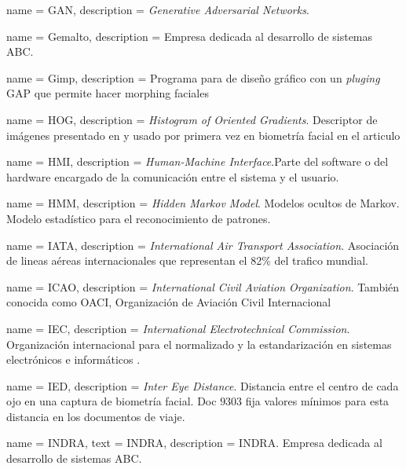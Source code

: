 {
    name        = {GAN},
    description = {\textit{Generative Adversarial Networks}.}
}

{
    name        = {Gemalto},
    description = {Empresa dedicada al desarrollo de sistemas ABC.}
}

{
    name        = {Gimp},
    description = {Programa para de diseño gráfico con un \textit{pluging} GAP que permite hacer \gls{morphing} faciales}
}

{
    name        = {HOG},
    description = {\textit{Histogram of Oriented Gradients}. Descriptor de imágenes presentado en \cite{mcconnell1986method} y usado por primera vez en biometría facial en el articulo \cite{shu2011histogram}}
}

{
    name        = {HMI},
    description = {\textit{Human-Machine Interface}.Parte del software o del hardware encargado de la comunicación entre el sistema y el usuario.}
}

{
    name        = {HMM},
    description = {\textit{Hidden Markov Model}. Modelos ocultos de Markov. Modelo estadístico para el reconocimiento de patrones.}
}

{
    name        = {IATA},
    description = {\textit{International Air Transport Association}. Asociación de lineas aéreas internacionales que representan el 82\% del trafico mundial.}
}

{
    name        = {ICAO},
    description = {\textit{International Civil Aviation Organization}. También conocida como OACI, Organización de Aviación Civil Internacional \cite{ICAOOnline}}
}

{
    name        = {IEC},
    description = {\textit{International Electrotechnical Commission}. Organización internacional para el normalizado y la estandarización en sistemas electrónicos e informáticos \cite{IECOnline}.}
}

{
    name        = {IED},
    description = {\textit{Inter Eye Distance}. Distancia entre el centro de cada ojo en una captura de biometría facial.  Doc $9303$ \cite{doc20069303} fija valores mínimos para esta distancia en los documentos de viaje.}
}

{
    name        = {INDRA},
    text        = \mbox{INDRA},
    description = {INDRA. Empresa dedicada al desarrollo de sistemas ABC.}
}

